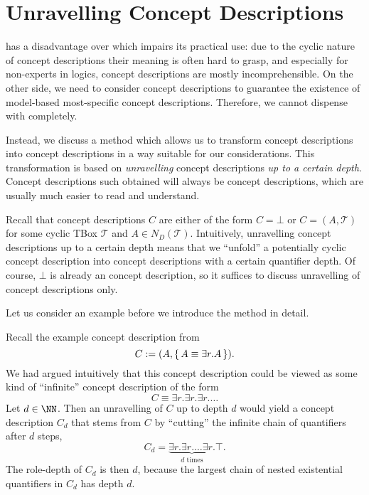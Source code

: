 \section{Unravelling \ELgfpbot Concept Descriptions}
\label{sec:unrav-elgfpb-conc}

\ELgfpbot has a disadvantage over \ELbot which impairs its practical use: due to the
cyclic nature of \ELgfpbot concept descriptions their meaning is often hard to grasp, and
especially for non-experts in logics, \ELgfpbot concept descriptions are mostly
incomprehensible.  On the other side, we need to consider \ELgfpbot concept descriptions
to guarantee the existence of model-based most-specific concept descriptions.  Therefore,
we cannot dispense with \ELgfpbot completely.

Instead, we discuss a method which allows us to transform \ELgfpbot concept descriptions
into \ELbot concept descriptions in a way suitable for our considerations.  This
transformation is based on \emph{unravelling} \ELgfpbot concept descriptions \emph{up to a
certain depth}.  Concept descriptions such obtained will always be \ELbot concept
descriptions, which are usually much easier to read and understand.

Recall that \ELgfpbot concept descriptions $C$ are either of the form $C = \bot$ or $C =
(A, \mathcal{T})$ for some cyclic TBox $\mathcal{T}$ and $A \in N_D(\mathcal{T})$.
Intuitively, unravelling \ELgfpbot concept descriptions up to a certain depth means that
we ``unfold'' a potentially cyclic \ELgfpbot concept description into \ELbot concept
descriptions with a certain quantifier depth.  Of course, $\bot$ is already an \ELbot
concept description, so it suffices to discuss unravelling of \ELgfp concept descriptions
only.

Let us consider an example before we introduce the method in detail.

\begin{Example}
  \label{expl:unravelling}
  Recall the example concept description from 
  \begin{equation*}
    C := (A, {\{\, A \equiv \exists r. A \,\}}).
  \end{equation*}
  We had argued intuitively that this concept description could be viewed as some kind of
  ``infinite'' \ELbot concept description of the form
  \begin{equation*}
    C \equiv \exists r. \exists r. \exists r. \dots
  \end{equation*}
  Let $d \in \NN$.  Then an unravelling of $C$ up to depth $d$ would yield a concept
  description $C_d$ that stems from $C$ by ``cutting'' the infinite chain of quantifiers
  after $d$ steps, \ie
  \begin{equation*}
    C_d = \underbrace{\exists r. \exists r. \dots \exists r.}_{d \text{ times}} \top.
  \end{equation*}
  The role-depth of $C_d$ is then $d$, because the largest chain of nested existential
  quantifiers in $C_d$ has depth $d$.
\end{Example}

